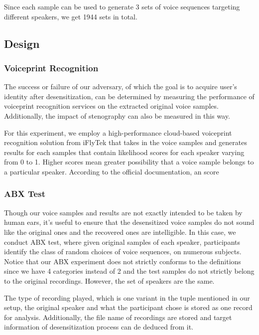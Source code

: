 \documentclass[journal]{IEEEtran} %
\begin{document}
Since each sample can be used to generate 3 sets of voice sequences targeting different speakers, we get 1944 sets in total.

\subsection{Design}

\subsubsection{Voiceprint Recognition}

The success or failure of our adversary, of which the goal is to acquire user's identity after desensitization, can be determined by measuring the performance of voiceprint recognition services on the extracted original voice samples. Additionally, the impact of stenography can also be measured in this way.

For this experiment, we employ a high-performance cloud-based voiceprint recognition solution from iFlyTek that takes in the voice samples and generates results for each samples that contain likelihood scores for each speaker varying from 0 to 1. Higher scores mean greater possibility that a voice sample belongs to a particular speaker. According to the official documentation, an score

\subsubsection{ABX Test}

Though our voice samples and results are not exactly intended to be taken by human ears, it's useful to ensure that the desensitized voice samples do not sound like the original ones and the recovered ones are intelligible. In this case, we conduct ABX test, where given original samples of each speaker, participants identify the class of random choices of voice sequences, on numerous subjects. Notice that our ABX experiment does not strictly conforms to the definitions since we have 4 categories instead of 2 and the test samples do not strictly belong to the original recordings. However, the set of speakers are the same.

The type of recording played, which is one variant in the tuple mentioned in our setup, the original speaker and what the participant chose is stored as one record for analysis. Additionally, the file name of recordings are stored and target information of desensitization process can de deduced from it.
\end{document}
